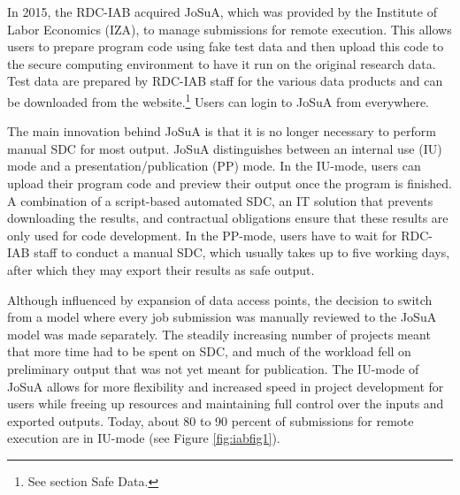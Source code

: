 In 2015, the RDC-IAB acquired JoSuA, which was provided by the Institute of Labor Economics (IZA), to manage submissions for remote execution. This allows users to prepare program code using fake test data and then upload this code to the secure computing environment to have it run on the original research data. Test data are prepared by RDC-IAB staff for the various data products and can be downloaded from the website.\footnote{See section Safe Data.} Users can login to JoSuA from everywhere.

The main innovation behind JoSuA is that it is no longer necessary to perform manual SDC for most output. JoSuA distinguishes between an internal use (IU) mode and a presentation/publication (PP) mode. In the IU-mode, users can upload their program code and preview their output once the program is finished. A combination of a script-based automated SDC, an IT solution that prevents downloading the results, and contractual obligations ensure that these results are only used for code development. In the PP-mode, users have to wait for RDC-IAB staff to conduct a manual SDC, which usually takes up to five working days, after which they may export their results as safe output.

Although influenced by expansion of data access points, the decision to switch from a model where every job submission was manually reviewed to the JoSuA model was made separately. The steadily increasing number of projects meant that more time had to be spent on SDC, and much of the workload fell on preliminary output that was not yet meant for publication. The IU-mode of JoSuA allows for more flexibility and increased speed in project development for users while freeing up resources and maintaining full control over the inputs and exported outputs. Today, about 80 to 90 percent of submissions for remote execution are in IU-mode (see Figure \ref{fig:iabfig1}).

